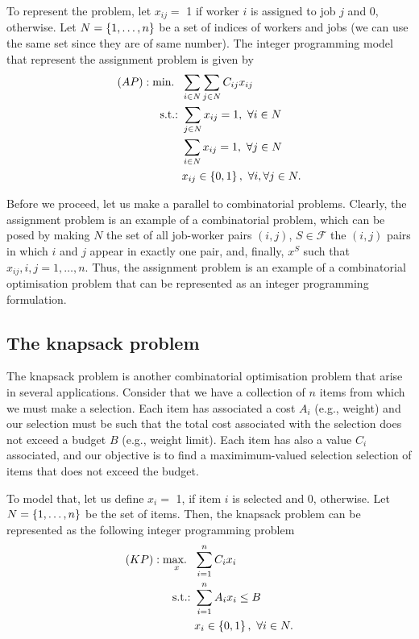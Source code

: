 To represent the problem, let $x_{ij} =$ 1 if worker $i$ is assigned to job $j$ and 0, otherwise. Let $N = \left\{ 1,\dots,n \right \}$ be a set of indices of workers and jobs (we can use the same set since they are of same number). The integer programming model that represent the assignment problem is given by
%  
\begin{align*} 
  (AP) : \mathop{\text{min.~}} \ & \sum_{i \in N}\sum_{j \in N} C_{ij}x_{ij} \\
  \mathop{\text{s.t.:~}} & \sum_{j \in N} x_{ij} = 1, \ \forall i \in N\\
      & \sum_{i \in N} x_{ij} = 1, \ \forall j \in N\\
      & x_{ij} \in \left\{ 0,1 \right \},  \ \forall i, \forall j \in N.
\end{align*}
%

Before we proceed, let us make a parallel to combinatorial problems. Clearly, the assignment problem is an example of a combinatorial problem, which can be posed by making $N$ the set of all job-worker pairs $(i,j)$, $S \in \mathcal{F}$ the $(i,j)$ pairs in which $i$ and $j$ appear in exactly one pair, and, finally, $x^S$ such that $x_{ij}, i,j = 1,\dots,n$. Thus, the assignment problem is an example of a combinatorial optimisation problem that can be represented as an integer programming formulation.


\subsection{The knapsack problem}

The knapsack problem is another combinatorial optimisation problem that arise in several applications. Consider that we have a collection of $n$ items from which we must make a selection. Each item has associated a cost $A_i$ (e.g., weight) and our selection must be such that the total cost associated with the selection does not exceed a budget $B$ (e.g., weight limit). Each item has also a value $C_i$ associated, and our objective is to find a maximimum-valued selection selection of items that does not exceed the budget. 

To model that, let us define $x_{i} =$ 1, if item $i$ is selected and 0, otherwise. Let $N = \left\{ 1,\dots,n \right \}$ be the set of items. Then, the knapsack problem can be represented as the following integer programming problem     
%  
\begin{align*}
	(KP) : \mathop{\text{max.~}}_x \ & \sum_{i=1}^nC_{i}x_{i} \\
	\mathop{\text{s.t.:~}} & \sum_{i = 1}^n A_{i}x_{i} \leq B\\
	  & x_{i} \in \left\{ 0,1 \right \}, \ \forall i \in N. 
\end{align*}

